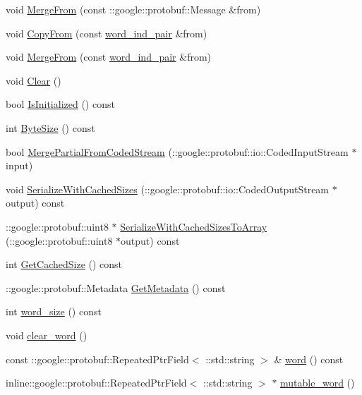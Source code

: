 \begin{DoxyCompactItemize}
void \hyperlink{class_l_d_a_1_1word__ind__pair_a096ab8dfabf98d4fc49104d5cc78f30f}{MergeFrom} (const ::google::protobuf::Message \&from)
\item 
void \hyperlink{class_l_d_a_1_1word__ind__pair_a7e0a5922b46cdcfc25b8679347c24450}{CopyFrom} (const \hyperlink{class_l_d_a_1_1word__ind__pair}{word\_\-ind\_\-pair} \&from)
\item 
void \hyperlink{class_l_d_a_1_1word__ind__pair_acafb6c56ada84bc671b31ee651ee1ae1}{MergeFrom} (const \hyperlink{class_l_d_a_1_1word__ind__pair}{word\_\-ind\_\-pair} \&from)
\item 
void \hyperlink{class_l_d_a_1_1word__ind__pair_a873e5641e708a95ab5f96c91b8c45e2e}{Clear} ()
\item 
bool \hyperlink{class_l_d_a_1_1word__ind__pair_a1161972f297fe3164a5fd6dfa9f22cf8}{IsInitialized} () const 
\item 
int \hyperlink{class_l_d_a_1_1word__ind__pair_a21383c22632c3f0cdc5d346bb1200392}{ByteSize} () const 
\item 
bool \hyperlink{class_l_d_a_1_1word__ind__pair_a35555668d4cc7c02b92d63a984234cb9}{MergePartialFromCodedStream} (::google::protobuf::io::CodedInputStream $\ast$input)
\item 
void \hyperlink{class_l_d_a_1_1word__ind__pair_ab6d861e57836e3177369b14cca855c77}{SerializeWithCachedSizes} (::google::protobuf::io::CodedOutputStream $\ast$output) const 
\item 
::google::protobuf::uint8 $\ast$ \hyperlink{class_l_d_a_1_1word__ind__pair_a8efc628f46d368ee24f5ca74fcb7993d}{SerializeWithCachedSizesToArray} (::google::protobuf::uint8 $\ast$output) const 
\item 
int \hyperlink{class_l_d_a_1_1word__ind__pair_a922d986b141e9fe7974241c6914213bb}{GetCachedSize} () const 
\item 
::google::protobuf::Metadata \hyperlink{class_l_d_a_1_1word__ind__pair_a961e6d93c3a647d4ca58cfdca7fe012c}{GetMetadata} () const 
\item 
int \hyperlink{class_l_d_a_1_1word__ind__pair_a648b4f09c48395e4256082e7a42b24a4}{word\_\-size} () const 
\item 
void \hyperlink{class_l_d_a_1_1word__ind__pair_aabd972a87a3f4024a385fad0df24c759}{clear\_\-word} ()
\item 
const ::google::protobuf::RepeatedPtrField$<$ ::std::string $>$ \& \hyperlink{class_l_d_a_1_1word__ind__pair_a5d2404f6aee1a31b4d346e4612da24c4}{word} () const 
\item 
inline::google::protobuf::RepeatedPtrField$<$ ::std::string $>$ $\ast$ \hyperlink{class_l_d_a_1_1word__ind__pair_afdcfa1f1e319fbc394c671ad94eb4f09}{mutable\_\-word} ()

\end{DoxyCompactItemize}
